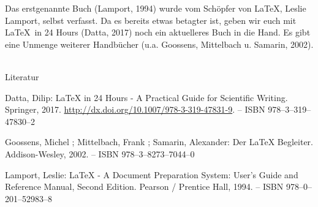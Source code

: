 Das erstgenannte Buch (Lamport, 1994) wurde vom Schöpfer von LaTeX, Leslie Lamport, selbst verfasst.
Da es bereits etwas betagter ist, geben wir euch mit \glqq{}\LaTeX\ in 24 Hours\grqq{} (Datta, 2017) noch ein aktuelleres Buch in die Hand.
Es gibt eine Unmenge weiterer Handbücher (u.\thinspace a. Goossens, Mittelbach u. Samarin, 2002).

~\\

\noindent Literatur

\noindent [Datta 2017] Datta, Dilip: LaTeX in 24 Hours - A Practical Guide for Scientific Writing. Springer, 2017. \url{http://dx.doi.org/10.1007/978-3-319-47831-9}. – ISBN 978–3–319–47830–2

\noindent [Goossens u. a. 2002] Goossens, Michel ; Mittelbach, Frank ; Samarin, Alexander: Der LaTeX Begleiter. Addison-Wesley, 2002. – ISBN 978–3–8273–7044–0

\noindent [Lamport 1994] Lamport, Leslie: LaTeX - A Document Preparation System: User’s Guide and Reference Manual, Second Edition. Pearson / Prentice Hall, 1994. – ISBN 978–0–201–52983–8
